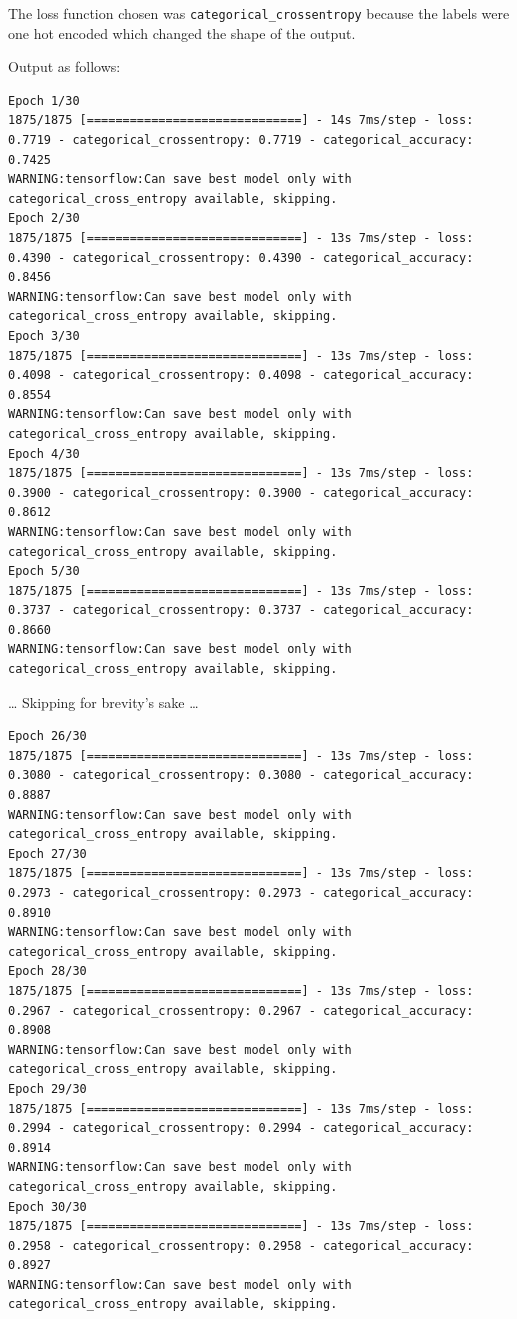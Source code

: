 \documentclass[12pt, letterpaper]{article}
\begin{document}
The loss function chosen was \texttt{categorical\_crossentropy} because the labels were one hot encoded which changed the shape of the output.

Output as follows:

\begin{mdframed}[backgroundcolor=bg]
\begin{lstlisting}
Epoch 1/30
1875/1875 [==============================] - 14s 7ms/step - loss: 0.7719 - categorical_crossentropy: 0.7719 - categorical_accuracy: 0.7425
WARNING:tensorflow:Can save best model only with categorical_cross_entropy available, skipping.
Epoch 2/30
1875/1875 [==============================] - 13s 7ms/step - loss: 0.4390 - categorical_crossentropy: 0.4390 - categorical_accuracy: 0.8456
WARNING:tensorflow:Can save best model only with categorical_cross_entropy available, skipping.
Epoch 3/30
1875/1875 [==============================] - 13s 7ms/step - loss: 0.4098 - categorical_crossentropy: 0.4098 - categorical_accuracy: 0.8554
WARNING:tensorflow:Can save best model only with categorical_cross_entropy available, skipping.
Epoch 4/30
1875/1875 [==============================] - 13s 7ms/step - loss: 0.3900 - categorical_crossentropy: 0.3900 - categorical_accuracy: 0.8612
WARNING:tensorflow:Can save best model only with categorical_cross_entropy available, skipping.
Epoch 5/30
1875/1875 [==============================] - 13s 7ms/step - loss: 0.3737 - categorical_crossentropy: 0.3737 - categorical_accuracy: 0.8660
WARNING:tensorflow:Can save best model only with categorical_cross_entropy available, skipping.
\end{lstlisting}
\end{mdframed}

\dots
Skipping for brevity's sake
\dots

\begin{mdframed}[backgroundcolor=bg]
\begin{lstlisting}
Epoch 26/30
1875/1875 [==============================] - 13s 7ms/step - loss: 0.3080 - categorical_crossentropy: 0.3080 - categorical_accuracy: 0.8887
WARNING:tensorflow:Can save best model only with categorical_cross_entropy available, skipping.
Epoch 27/30
1875/1875 [==============================] - 13s 7ms/step - loss: 0.2973 - categorical_crossentropy: 0.2973 - categorical_accuracy: 0.8910
WARNING:tensorflow:Can save best model only with categorical_cross_entropy available, skipping.
Epoch 28/30
1875/1875 [==============================] - 13s 7ms/step - loss: 0.2967 - categorical_crossentropy: 0.2967 - categorical_accuracy: 0.8908
WARNING:tensorflow:Can save best model only with categorical_cross_entropy available, skipping.
Epoch 29/30
1875/1875 [==============================] - 13s 7ms/step - loss: 0.2994 - categorical_crossentropy: 0.2994 - categorical_accuracy: 0.8914
WARNING:tensorflow:Can save best model only with categorical_cross_entropy available, skipping.
Epoch 30/30
1875/1875 [==============================] - 13s 7ms/step - loss: 0.2958 - categorical_crossentropy: 0.2958 - categorical_accuracy: 0.8927
WARNING:tensorflow:Can save best model only with categorical_cross_entropy available, skipping.
\end{lstlisting}
\end{mdframed}
\end{document}
